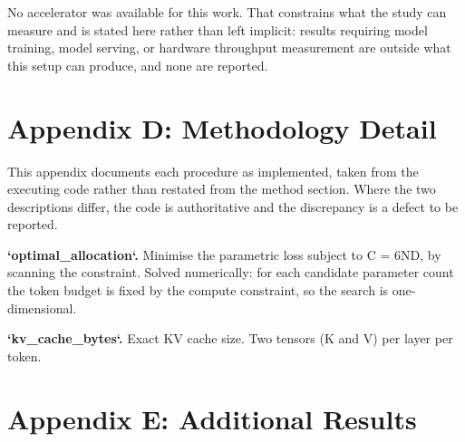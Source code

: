 \documentclass{article}
\begin{document}
No accelerator was available for this work. That constrains what the study can measure and is stated here rather than left implicit: results requiring model training, model serving, or hardware throughput measurement are outside what this setup can produce, and none are reported.




\section{Appendix D: Methodology Detail}


This appendix documents each procedure as implemented, taken from the executing code rather than restated from the method section. Where the two descriptions differ, the code is authoritative and the discrepancy is a defect to be reported.

\textbf{`optimal\_allocation`.} Minimise the parametric loss subject to C = 6ND, by scanning the constraint. Solved numerically: for each candidate parameter count the token budget is fixed by the compute constraint, so the search is one-dimensional.

\textbf{`kv\_cache\_bytes`.} Exact KV cache size. Two tensors (K and V) per layer per token.




\section{Appendix E: Additional Results}
\end{document}
